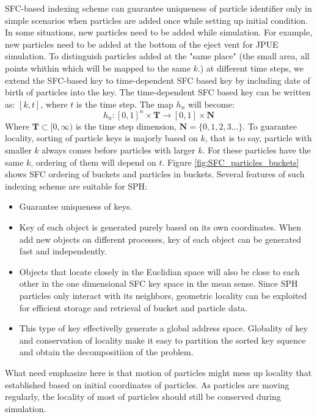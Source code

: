 \documentclass[conference,compsoc]{IEEEtran}
\begin{document}
SFC-based indexing scheme can guarantee uniqueness of particle identifier only in simple scenarios when particles are added once while setting up initial condition. In some situations, new particles need to be added while simulation. For example, new particles need to be added at the bottom of the eject vent for JPUE simulation. To distinguish particles added at the "same place" (the small area, all points whithin which will be mapped to the same $k$.) at different time steps, we extend the SFC-based key to time-dependent SFC based key by including date of birth of particles into the key. The time-dependent SFC based key can be written as: $[k,t]$, where $t$ is the time step. The map $h_n$ will become:
\begin{equation}
h_n: [0,1]^n \times \textbf{T} \rightarrow [0,1] \times \textbf{N}
\end{equation}
Where $\textbf{T} \subset [0,\infty)$ is the time step dimension, $\textbf{N}=\lbrace 0, 1, 2, 3...\rbrace$.
To guarantee locality, sorting of particle keys is majorly based on $k$, that is to say, particle with smaller $k$ always comes before particles with larger $k$. For these particles have the same $k$, ordering of them will depend on $t$. Figure \ref{fig:SFC_particles_buckets} shows SFC ordering of buckets and particles in buckets. 
Several features of such indexing scheme are suitable for SPH:
\begin{itemize}
\item Guarantee uniqueness of keys.
\item Key of each object is generated purely based on its own coordinates. When add new objects on different processes, key of each object can be generated fast and independently.
\item Objects that locate closely in the Euclidian space will also be close to each other in the one dimensional SFC key space in the mean sense. Since SPH particles only interact with its neighbors, geometric locality can be exploited for efficient storage and retrieval of bucket and particle data.
\item This type of key effectivelly generate a global address space. Globality of key and conservation of locality make it easy to partition the sorted key squence and obtain the decompositiion of the problem.
\end{itemize}
What need emphasize here is that motion of particles might mess up locality that established based on initial coordinates of particles. As particles are moving regularly, the locality of most of particles should still be conserved during simulation.
\end{document}
